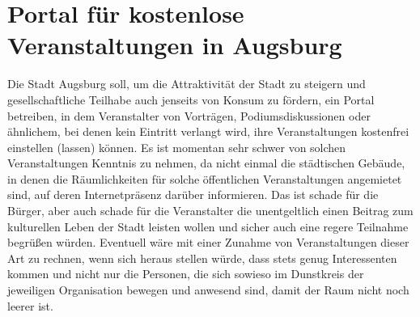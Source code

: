   \section{Portal für kostenlose Veranstaltungen in Augsburg}
  
  Die Stadt Augsburg soll, um die Attraktivität der Stadt zu steigern und 
  gesellschaftliche Teilhabe auch jenseits von Konsum zu fördern, ein Portal 
  betreiben, in dem Veranstalter von Vorträgen, Podiumsdiskussionen oder 
  ähnlichem, bei denen kein Eintritt verlangt wird, ihre Veranstaltungen 
  kostenfrei einstellen (lassen) können. Es ist momentan sehr schwer von 
  solchen Veranstaltungen Kenntnis zu nehmen, da nicht einmal die städtischen 
  Gebäude, in denen die Räumlichkeiten für solche öffentlichen 
  Veranstaltungen angemietet sind, auf deren Internetpräsenz darüber 
  informieren. Das ist schade für die Bürger, aber auch schade für die 
  Veranstalter die unentgeltlich einen Beitrag zum kulturellen Leben der 
  Stadt leisten wollen und sicher auch eine regere Teilnahme begrüßen würden. 
  Eventuell wäre mit einer Zunahme von Veranstaltungen dieser Art zu rechnen, 
  wenn sich heraus stellen würde, dass stets genug Interessenten kommen und 
  nicht nur die Personen, die sich sowieso im Dunstkreis der jeweiligen 
  Organisation bewegen und anwesend sind, damit der Raum nicht noch leerer 
  ist.
